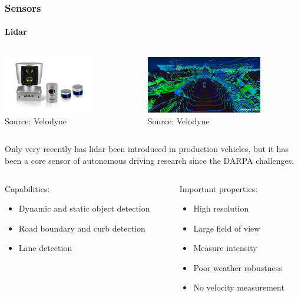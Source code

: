 \begin{frame}
\frametitle{Sensors}
\framesubtitle{Lidar}
\begin{columns}[T]
    \begin{column}{.5\textwidth}
        \centering
        \includegraphics[height=2.5cm]{images/velodyne_lidars.png}\\
        \tiny{Source: Velodyne\footnotemark[1]}
    \end{column}
    \begin{column}{.5\textwidth}
        \centering
        \includegraphics[height=2.5cm]{images/velodyne_pointcloud.jpg}\\
        \tiny{Source: Velodyne\footnotemark[1]}
    \end{column}
\end{columns}

\vspace{0.2cm}

\footnotesize
Only very recently has lidar been introduced in production vehicles, but it has
been a core sensor of autonomous driving research since the DARPA challenges.

\begin{columns}[T]
    \begin{column}{0.4\textwidth}
        \footnotesize
        Capabilities:
        \begin{itemize}
            \item Dynamic and static object detection
            \item Road boundary and curb detection
            \item Lane detection
        \end{itemize}
    \end{column}
    \begin{column}{0.6\textwidth}
        \footnotesize
        Important properties:
        \begin{itemize}
            \item High resolution
            \item Large field of view
            \item Measure intensity
            \item Poor weather robustness
            \item No velocity measurement
        \end{itemize}
    \end{column}
\end{columns}
\end{frame}

